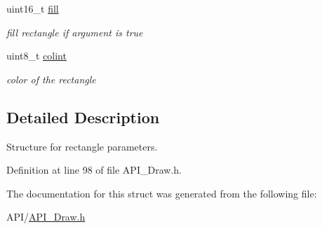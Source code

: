 \begin{DoxyCompactItemize}
\mbox{\label{struct_s_q_u_a_r_e_abd83f5d2f2e1a767233d92cba99540f5}} 
uint16\+\_\+t \hyperlink{struct_s_q_u_a_r_e_abd83f5d2f2e1a767233d92cba99540f5}{fill}
\begin{DoxyCompactList}\small\item\em fill rectangle if argument is true \end{DoxyCompactList}\item 
\mbox{\label{struct_s_q_u_a_r_e_a21caa4b27a71b7967f1a2d64f196a674}} 
uint8\+\_\+t \hyperlink{struct_s_q_u_a_r_e_a21caa4b27a71b7967f1a2d64f196a674}{colint}
\begin{DoxyCompactList}\small\item\em color of the rectangle \end{DoxyCompactList}\end{DoxyCompactItemize}


\subsection{Detailed Description}
Structure for rectangle parameters. 

Definition at line 98 of file A\+P\+I\+\_\+\+Draw.\+h.



The documentation for this struct was generated from the following file\+:\begin{DoxyCompactItemize}
\item 
A\+P\+I/\hyperlink{_a_p_i___draw_8h}{A\+P\+I\+\_\+\+Draw.\+h}\end{DoxyCompactItemize}
